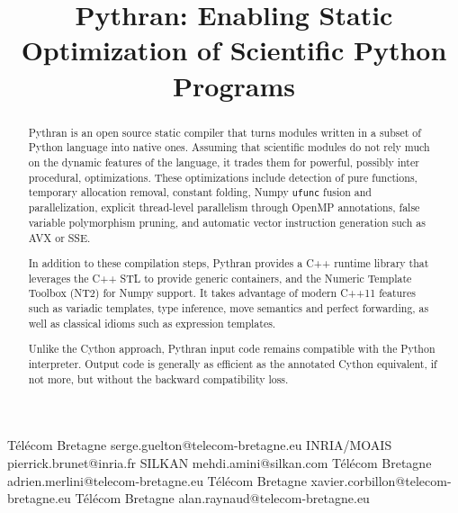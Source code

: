 \documentclass[10pt, onecolumn, preprint]{sigplanconf}
\begin{document}
\title{Pythran: Enabling Static Optimization of Scientific Python Programs}

           {T{\'e}l{\'e}com Bretagne}
           {serge.guelton@telecom-bretagne.eu}
           {INRIA/MOAIS}
           {pierrick.brunet@inria.fr}
           {SILKAN}
           {mehdi.amini@silkan.com}
           {T{\'e}l{\'e}com Bretagne}
           {adrien.merlini@telecom-bretagne.eu}
           {T{\'e}l{\'e}com Bretagne}
           {xavier.corbillon@telecom-bretagne.eu}
           {T{\'e}l{\'e}com Bretagne}
           {alan.raynaud@telecom-bretagne.eu}

\maketitle

\begin{abstract}

    Pythran is an open source static compiler that turns modules written in a
    subset of Python language into native ones. Assuming that scientific
    modules do not rely much on the dynamic features of the language, it trades
    them for powerful, possibly inter procedural, optimizations.  These
    optimizations include detection of pure functions, temporary allocation
    removal, constant folding, Numpy \texttt{ufunc} fusion and parallelization,
    explicit thread-level parallelism through OpenMP annotations, false
    variable polymorphism pruning, and automatic vector instruction generation
    such as AVX or SSE.

    In addition to these compilation steps, Pythran provides a C++ runtime 
    library that
    leverages the C++ STL to provide generic containers, and the Numeric 
    Template Toolbox (NT2) for Numpy support. It takes advantage of modern C++11
    features such as variadic templates, type inference, move semantics and
    perfect forwarding, as well as classical idioms such as expression templates.

    Unlike the Cython approach, Pythran input code remains compatible with the
    Python interpreter. Output code is generally as efficient as the annotated
    Cython equivalent, if not more, but without the backward compatibility
    loss.


\end{abstract}
\end{document}
